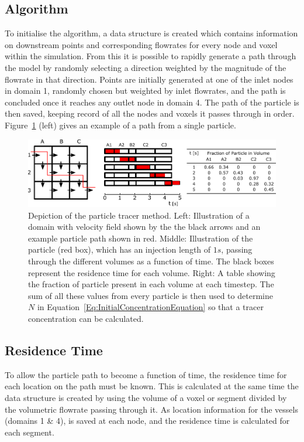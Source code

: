 \documentclass[11pt,english,a4paper,twoside,openright]{report}
\begin{document}
{{{{{{{\subsection{Algorithm}

To initialise the algorithm, a data structure is created which contains information on downstream points and corresponding flowrates for every node and voxel within the simulation. From this it is possible to rapidly generate a path through the model by randomly selecting a direction weighted by the magnitude of the flowrate in that direction. Points are initially generated at one of the inlet nodes in domain 1, randomly chosen but weighted by inlet flowrates, and the path is concluded once it reaches any outlet node in domain 4. The path of the particle is then saved, keeping record of all the nodes and voxels it passes through in order. Figure~\ref{fig:ParticleTracerIllustration} (left) gives an example of a path from a single particle. 

\begin{figure}[h]
	\centering
	\includegraphics[width=\textwidth]{Thesis/drawing-2}
	\caption[Depiction of the particle tracer method]{Depiction of the particle tracer method. Left: Illustration of a domain with velocity field shown by the the black arrows and an example particle path shown in red. Middle: Illustration of the particle (red box), which has an injection length of $1s$, passing through the different volumes as a function of time. The black boxes represent the residence time for each volume. Right: A table showing the fraction of particle present in each volume at each timestep. The sum of all these values from every particle is then used to determine $N$ in Equation~\ref{Eq:InitialConcentrationEquation} so that a tracer concentration can be calculated.}
	\label{fig:ParticleTracerIllustration}
\end{figure}

\subsection{Residence Time}

To allow the particle path to become a function of time, the residence time for each location on the path must be known. This is calculated at the same time the data structure is created by using the volume of a voxel or segment divided by the volumetric flowrate passing through it. As location information for the vessels (domains 1 \& 4), is saved at each node, and the residence time is calculated for each segment.

}}}}}}}
\end{document}
